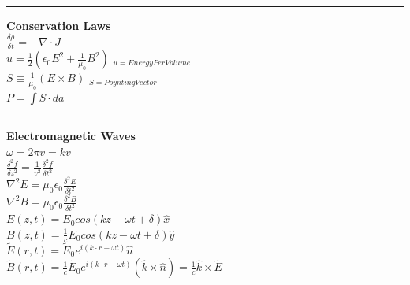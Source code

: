 \documentclass[1pt]{report}
\begin{document}
\begin{multicols}{3}
\begin{flushleft}
\noindent\rule[0.5ex]{\linewidth}{1pt}

\textbf{Conservation Laws}\\
$\frac{\delta\rho}{\delta t}=-\nabla\cdot J$\\
$u=\frac{1}{2}(\epsilon_0E^2+\frac{1}{\mu_0}B^2)$ $_{u=EnergyPerVolume}$\\
$S\equiv\frac{1}{\mu_0}(E\times B)$ $_{S=PoyntingVector}$\\
$P=\int S\cdot da$\\

\noindent\rule[0.5ex]{\linewidth}{1pt}

\textbf{Electromagnetic Waves}\\
$\omega=2\pi v=kv$\\
$\frac{\delta^2 f}{\delta z^2}=\frac{1}{v^2}\frac{\delta^2 f}{\delta t^2}$\\
$\nabla^2E=\mu_0\epsilon_0\frac{\delta^2E}{\delta t^2}$\\
$\nabla^2B=\mu_0\epsilon_0\frac{\delta^2B}{\delta t^2}$\\
$E(z,t)=E_0cos(kz-\omega t+\delta)\hat{x}$\\
$B(z,t)=\frac{1}{c}E_0cos(kz-\omega t+\delta)\hat{y}$\\
$\tilde{E}(r,t)=\tilde{E}_0e^{i(k\cdot r-\omega t)}\hat{n}$\\
$\tilde{B}(r,t)=\frac{1}{c}\tilde{E}_0e^{i(k\cdot r-\omega t)}(\hat{k}\times\hat{n})=\frac{1}{c}\hat{k}\times\tilde{E}$\\

\end{flushleft}
\end{multicols}
\end{document}
